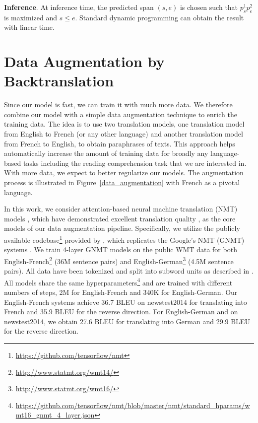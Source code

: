 \documentclass{article} \usepackage{iclr2018_conference,times}
\begin{document}
\textbf{Inference}. At inference time, the predicted span $(s, e)$ is chosen such that $p^1_sp^2_e$ is maximized and $s\le e$. Standard dynamic programming can obtain the result with linear time.






























 \section{Data Augmentation by Backtranslation}\label{sec:aug}
Since our model is fast, we can train it with much more data. We therefore combine our model with a simple data augmentation technique to enrich the training data. The idea is to use two translation models, one translation model from English to French (or any other language) and another translation model from French to English, to obtain paraphrases of texts. This approach helps automatically increase the amount of training data for broadly any language-based tasks including the reading comprehension task that we are interested in. With more data, we expect to better regularize our models. The augmentation process is illustrated in Figure~\ref{data_augmentation} with French as a pivotal language. 

In this work, we consider attention-based neural machine translation (NMT) models \cite{bahdanau2014neural,luong15attn}, which have demonstrated excellent translation quality \cite{wu2016google}, as the core models of our data augmentation pipeline. Specifically, we utilize the publicly available codebase\footnote{\url{https://github.com/tensorflow/nmt}} provided by \citet{luong17}, which replicates the Google's NMT (GNMT) systems \cite{wu2016google}. 
We train 4-layer GNMT models on the public WMT data for both English-French\footnote{\url{http://www.statmt.org/wmt14/}}  (36M sentence pairs) and English-German\footnote{\url{http://www.statmt.org/wmt16/}} (4.5M sentence pairs). All data have been tokenized and split into subword units as described in \cite{luong17}. All models share the same hyperparameters\footnote{\url{https://github.com/tensorflow/nmt/blob/master/nmt/standard_hparams/wmt16_gnmt_4_layer.json}} and are trained with different numbers of steps, 2M for English-French and 340K for English-German.
Our English-French systems achieve 36.7 BLEU on newstest2014 for translating into French and 35.9 BLEU for the reverse direction. For English-German and on newstest2014, we obtain 27.6 BLEU for translating into German and 29.9 BLEU for the reverse direction.
\end{document}
